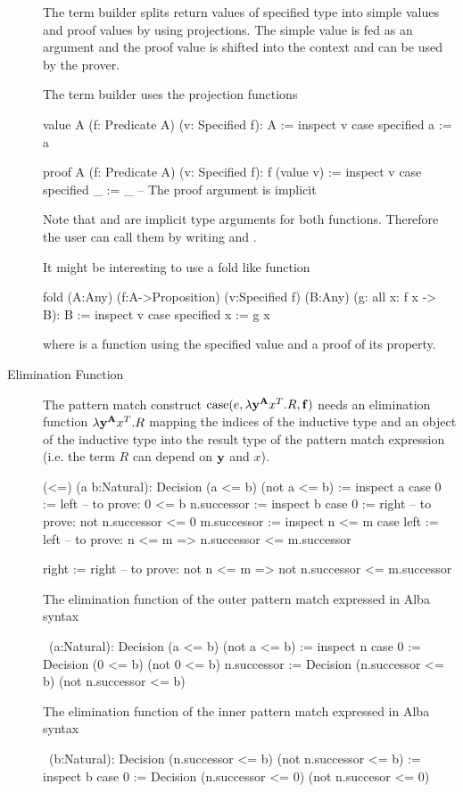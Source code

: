 \begin{description}
  The term builder splits return values of specified type into simple values
  and proof values by using projections. The simple value is fed as an
  argument and the proof value is shifted into the context and can be used by
  the prover.

  The term builder uses the projection functions
  \begin{alba}
     value A (f: Predicate A) (v: Specified f): A :=
       inspect v case
         specified a := a

     proof A (f: Predicate A) (v: Specified f): f (value v) :=
       inspect v case
         specified _ := _     -- The proof argument is implicit
  \end{alba}
  Note that  and  are implicit type arguments for both
  functions. Therefore the user can call them by writing  and
  .

  It might be interesting to use a fold like function
  \begin{alba}
     fold (A:Any) (f:A->Proposition) (v:Specified f)
          (B:Any) (g: all x: f x -> B): B :=
       inspect v case
         specified x := g x
  \end{alba}
  where  is a function using the specified value and a proof of its
  property.

\item[Elimination Function]
  The pattern match construct
  $\text{case}(e, \lambda \mathbf{y}^{\mathbf{A}} x^T . R, \mathbf{f})$ needs an elimination
  function $\lambda \mathbf{y}^{\mathbf{A}} x^T . R$ mapping the indices of the
  inductive type and an object of the inductive type into the result type of
  the pattern match expression (i.e. the term $R$ can depend on $\mathbf{y}$ and
  $x$).
  \begin{alba}
     (<=) (a b:Natural): Decision (a <= b) (not a <= b) :=
        inspect a case
          0 :=
            left                 -- to prove: 0 <= b
          n.successor :=
            inspect b case
              0 :=
                right            -- to prove: not n.successor <= 0
              m.successor :=
                inspect n <= m case
                  left  := left
                    -- to prove: n <= m => n.successor <= m.successor

                  right := right
                    -- to prove: not n <= m => not n.successor <= m.successor
  \end{alba}
  The elimination function of the outer pattern match expressed in Alba syntax
  \begin{alba}
    \ (a:Natural): Decision (a <= b) (not a <= b) :=
      inspect n case
        0 :=
          Decision (0 <= b) (not 0 <= b)
        n.successor :=
          Decision (n.successor <= b) (not n.successor <= b)
  \end{alba}
  The elimination function of the inner pattern match expressed in Alba syntax
  \begin{alba}
    \ (b:Natural): Decision (n.successor <= b) (not n.successor <= b) :=
      inspect b case
        0 :=
          Decision (n.successor <= 0) (not n.succesor <= 0)


\end{alba}
\end{description}
